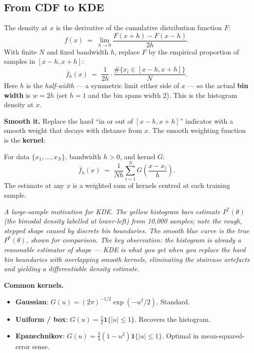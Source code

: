 \documentclass[11pt, a4paper]{article}
\begin{document}
\subsection{From CDF to KDE}

The density at $x$ is the derivative of the cumulative distribution function $F$:
\[
f(x) \;=\; \lim_{h\to 0}\frac{F(x+h) - F(x-h)}{2h}.
\]
With finite $N$ and fixed bandwidth $h$, replace $F$ by the empirical proportion of samples in $[x-h, x+h]$:
\[
\bar f_h(x) \;=\; \frac{1}{2h}\cdot\frac{\#\{x_i \in [x-h, x+h]\}}{N}.
\]
Here $h$ is the \emph{half-width} — a symmetric limit either side of $x$ — so the actual \textbf{bin width} is $w = 2h$ (set $h=1$ and the bin spans width $2$). This is the histogram density at $x$.

\textbf{Smooth it.} Replace the hard ``in or out of $[x-h, x+h]$'' indicator with a smooth weight that decays with distance from $x$. The smooth weighting function is the \textbf{kernel}:

\begin{defbox}
For data $\{x_1, \ldots, x_N\}$, bandwidth $h>0$, and kernel $G$:
\[
\bar f_h(x) \;=\; \frac{1}{Nh}\sum_{i=1}^N G\!\left(\frac{x-x_i}{h}\right).
\]
The estimate at any $x$ is a weighted sum of kernels centred at each training sample.
\end{defbox}

\begin{center}

\footnotesize\textit{A large-sample motivation for KDE. The yellow histogram bars estimate $P^*(\theta)$ (the bimodal density labelled at lower-left) from 10{,}000 samples; note the rough, stepped shape caused by discrete bin boundaries. The smooth blue curve is the true $P^*(\theta)$, shown for comparison. The key observation: the histogram is already a reasonable estimator of shape --- KDE is what you get when you replace the hard bin boundaries with overlapping smooth kernels, eliminating the staircase artefacts and yielding a differentiable density estimate.}
\end{center}

\textbf{Common kernels.}
\begin{itemize}
  \item \textbf{Gaussian}: $G(u) = (2\pi)^{-1/2}\exp(-u^2/2)$. Standard.
  \item \textbf{Uniform / box}: $G(u) = \tfrac{1}{2}\mathbf{1}\{|u|\le 1\}$. Recovers the histogram.
  \item \textbf{Epanechnikov}: $G(u) = \tfrac{3}{4}(1-u^2)\mathbf{1}\{|u|\le 1\}$. Optimal in mean-squared-error sense.
\end{itemize}
\end{document}
